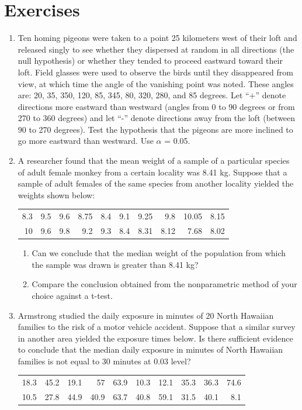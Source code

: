 \documentclass{article}
\begin{document}
\section{Exercises}

\begin{enumerate}
    \item Ten homing pigeons were taken to a point 25 kilometers west of their loft and released singly to see whether they dispersed at random in all directions (the null hypothesis) or whether they tended to proceed eastward toward their loft. Field glasses were used to observe the birds until they disappeared from view, at which time the angle of the vanishing point was noted. These angles are: 20, 35, 350, 120, 85, 345, 80, 320, 280, and 85 degrees. Let ``+'' denote directions more eastward than westward (angles from 0 to 90 degrees or from 270 to 360 degrees) and let ``-'' denote directions away from the loft (between 90 to 270 degrees). Test the hypothesis that the pigeons are more inclined to go more eastward than westward. Use $\alpha$ = 0.05.
    
    \item A researcher found that the mean weight of a sample of a particular species of adult female monkey from a certain locality was 8.41 kg. Suppose that a sample of adult females of the same species from another locality yielded the weights shown below:
    \begin{table}[H]
    \begin{tabular}{rrrrrrrrrr}
    8.3 & 9.5 & 9.6 & 8.75 & 8.4 & 9.1 & 9.25 & 9.8 & 10.05 & 8.15 \\
    10 & 9.6 & 9.8 & 9.2 & 9.3 & 8.4 & 8.31 & 8.12 & 7.68 & 8.02
    \end{tabular}
    \end{table}
    \begin{enumerate}
        \item Can we conclude that the median weight of the population from which the sample was drawn is greater than 8.41 kg?
        \item Compare the conclusion obtained from the nonparametric method of your choice against a t-test.
    \end{enumerate}
    
    \item Armstrong studied the daily exposure in minutes of 20 North Hawaiian families to the risk of a motor vehicle accident. Suppose that a similar survey in another area yielded the exposure times below. Is there sufficient evidence to conclude that the median daily exposure in minutes of North Hawaiian families is not equal to 30 minutes at 0.03 level?
    \begin{table}[H]
    \begin{tabular}{rrrrrrrrrr}
    18.3 & 45.2 & 19.1 & 57 & 63.9 & 10.3 & 12.1 & 35.3 & 36.3 & 74.6 \\
    10.5 & 27.8 & 44.9 & 40.9 & 63.7 & 40.8 & 59.1 & 31.5 & 40.1 & 8.1
    \end{tabular}
    \end{table}


\end{enumerate}
\end{document}
